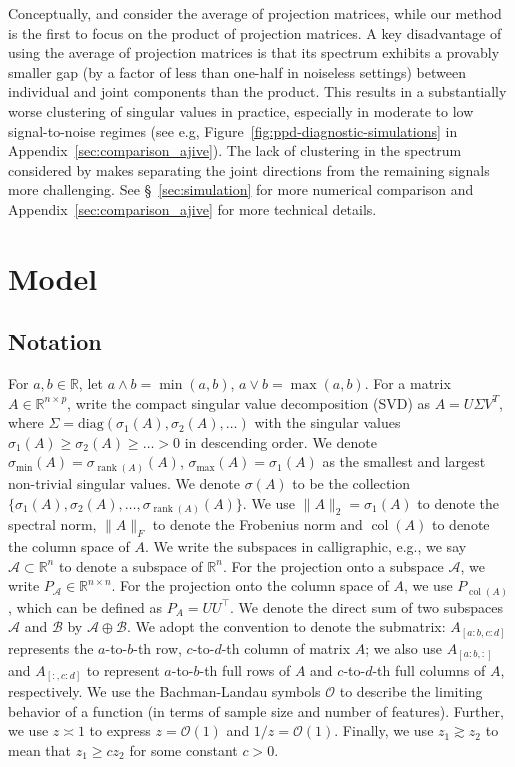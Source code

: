 \documentclass{amsart}
\def\R{\mathbb{R}} %
\DeclareMathOperator*{\col}{col}
\DeclareMathOperator*{\rank}{rank}
\newcommand{\Acal}{\mathcal{A}}
\begin{document}
Conceptually, \citet{feng2018angle} { and \citet{chenTwostageLinkedComponent2022} consider} the average of projection matrices, while our method is the first to focus on the product of projection matrices. A key disadvantage of using the average of projection matrices is that its spectrum exhibits a provably smaller gap (by a factor of less than one-half in noiseless settings) between individual and joint components than the product. This results in a substantially worse clustering of singular values in practice, especially in moderate to low signal-to-noise regimes (see e.g, Figure~\ref{fig:ppd-diagnostic-simulations}
 in Appendix~\ref{sec:comparison_ajive}). The lack of clustering in the spectrum considered by \citet{feng2018angle} makes separating the joint directions from the remaining signals more challenging. See \S~\ref{sec:simulation} for more numerical comparison and Appendix~\ref{sec:comparison_ajive} for more technical details.
 
\section{Model}

\subsection{Notation}\label{sec:notation}

For $a, b \in \mathbb{R}$, let $a \wedge b = \min(a, b)$, $a \vee b = \max(a, b)$. For a matrix $A \in \mathbb{R}^{n \times p}$, write the compact singular value decomposition (SVD) as $A = U \Sigma V^T$, where $\Sigma = \text{diag}(\sigma_1(A), \sigma_2(A), \dots)$ with the singular values $\sigma_1(A) \geq \sigma_2(A) \geq \dots > 0$ in descending order. We denote $\sigma_{\min}(A) = \sigma_{\rank(A)}(A)$, $\sigma_{\max}(A) = \sigma_1(A)$ as the smallest and largest non-trivial singular values. We denote $\sigma(A)$ to be the collection $\{\sigma_1(A),\sigma_2(A), \dots,\sigma_{\rank(A)}(A)\}$. We use $\|A\|_2 = \sigma_1(A)$ to denote the spectral norm, $\|A\|_F$ to denote the Frobenius norm and $\col(A)$ to denote the column space of $A$. We write the subspaces in calligraphic, e.g., we say $\Acal \subset \R^{n}$ to denote a subspace of $\R^n$. For the projection onto a subspace $\Acal$, we write $P_{\Acal} \in \mathbb{R}^{n \times n}$. For the projection onto the column space of $A$, we use $P_{\col(A)}$, which can be defined as $P_A = U U^\top$. We denote the direct sum of two subspaces $\mathcal{A}$ and $\mathcal{B}$ by $\mathcal{A} \oplus \mathcal{B}$. We adopt the convention to denote the submatrix: $A_{[a:b,c:d]}$ represents the $a$-to-$b$-th row, $c$-to-$d$-th column of matrix $A$; we also use $A_{[a:b,:]}$ and $A_{[:,c:d]}$ to represent $a$-to-$b$-th full rows of $A$ and $c$-to-$d$-th full columns of $A$, respectively. { We use the
Bachman-Landau symbols $\mathcal{O}$ to describe the limiting behavior of a function (in terms of sample size and number of features). Further, we use $z \asymp 1$ to express $z = \mathcal{O}(1)$ and $1/z = \mathcal{O}(1)$. Finally, we use $z_1 \gtrsim z_2$ to mean that $z_1 \geq {c}z_2$ for some constant $c>0$.} 
\end{document}
